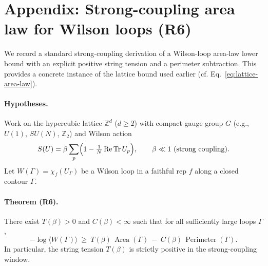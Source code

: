 \documentclass[11pt]{amsart}
\begin{document}
\section{Appendix: Strong-coupling area law for Wilson loops (R6)}

We record a standard strong-coupling derivation of a Wilson-loop area-law lower bound with an explicit positive string tension and a perimeter subtraction. This provides a concrete instance of the lattice bound used earlier (cf. Eq.~\eqref{eq:lattice-area-law}).

\paragraph{Hypotheses.}
Work on the hypercubic lattice $\mathbb{Z}^d$ ($d\ge 2$) with compact gauge group $G$ (e.g., $U(1)$, $SU(N)$, $\mathbb{Z}_2$) and Wilson action
\[
  S(U)=\beta \sum_{p} \Bigl(1-\tfrac{1}{N}\operatorname{Re}\operatorname{Tr} U_p\Bigr),\qquad \beta\ll 1\ \text{(strong coupling)}.
\]
Let $W(\Gamma)=\chi_f(U_\Gamma)$ be a Wilson loop in a faithful rep $f$ along a closed contour $\Gamma$.

\paragraph{Theorem (R6).}
There exist $T(\beta)>0$ and $C(\beta)<\infty$ such that for all sufficiently large loops $\Gamma$,
\[
  -\log \langle W(\Gamma)\rangle\ \ge\ T(\beta)\,\operatorname{Area}(\Gamma)\ -\ C(\beta)\,\operatorname{Perimeter}(\Gamma).
\]
In particular, the string tension $T(\beta)$ is strictly positive in the strong-coupling window.
\end{document}
